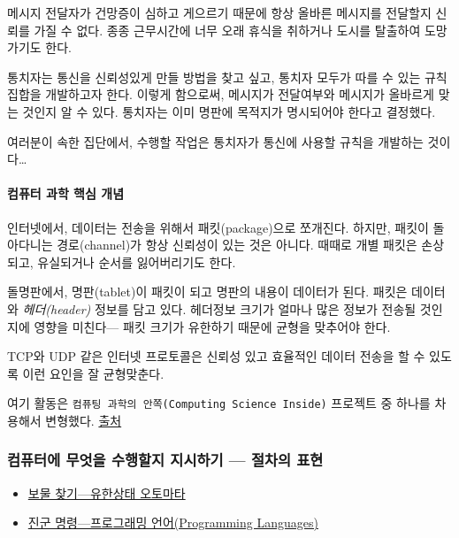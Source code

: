 \documentclass[]{article}
\begin{document}
메시지 전달자가 건망증이 심하고 게으르기 때문에 항상 올바른 메시지를
전달할지 신뢰를 가질 수 없다. 종종 근무시간에 너무 오래 휴식을 취하거나
도시를 탈출하여 도망가기도 한다.

통치자는 통신을 신뢰성있게 만들 방법을 찾고 싶고, 통치자 모두가 따를 수
있는 규칙 집합을 개발하고자 한다. 이렇게 함으로써, 메시지가 전달여부와
메시지가 올바르게 맞는 것인지 알 수 있다. 통치자는 이미 명판에 목적지가
명시되어야 한다고 결정했다.

여러분이 속한 집단에서, 수행할 작업은 통치자가 통신에 사용할 규칙을
개발하는 것이다\ldots{}

\mbox{}\paragraph{컴퓨터 과학 핵심 개념}\label{section-152}

인터넷에서, 데이터는 전송을 위해서 패킷(package)으로 쪼개진다. 하지만,
패킷이 돌아다니는 경로(channel)가 항상 신뢰성이 있는 것은 아니다. 때때로
개별 패킷은 손상되고, 유실되거나 순서를 잃어버리기도 한다.

돌명판에서, 명판(tablet)이 패킷이 되고 명판의 내용이 데이터가 된다.
패킷은 데이터와 \emph{헤더(header)} 정보를 담고 있다. 헤더정보 크기가
얼마나 많은 정보가 전송될 것인지에 영향을 미친다--- 패킷 크기가 유한하기
때문에 균형을 맞추어야 한다.

TCP와 UDP 같은 인터넷 프로토콜은 신뢰성 있고 효율적인 데이터 전송을 할
수 있도록 이런 요인을 잘 균형맞춘다.

여기 활동은 \texttt{컴퓨팅 과학의 안쪽(Computing Science Inside)}
프로젝트 중 하나를 차용해서 변형했다.
\href{http://csi.dcs.gla.ac.uk}{출처}


\subsubsection{컴퓨터에 무엇을 수행할지 지시하기 --- 절차의
표현}\label{mdash---2}

\begin{itemize}
\itemsep1pt\parskip0pt
\item
  \href{csunplugged/03-part/12-fsm.html}{보물 찾기---유한상태 오토마타}
\item
  \href{csunplugged/03-part/13-language.html}{진군 명령---프로그래밍
  언어(Programming Languages)}
\end{itemize}
\end{document}
